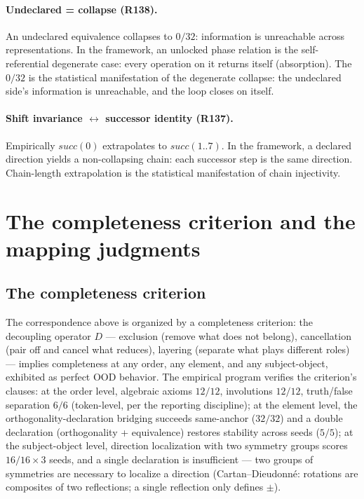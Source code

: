 \documentclass[sigplan,10pt,anonymous,review]{acmart}
\begin{document}
\paragraph{Undeclared = collapse (R138).}
An undeclared equivalence collapses to $0/32$: information is
unreachable across representations. In the framework, an unlocked phase
relation is the self-referential degenerate case: every operation on it
returns itself (absorption). The $0/32$ is the statistical
manifestation of the degenerate collapse: the undeclared side's
information is unreachable, and the loop closes on itself.

\paragraph{Shift invariance $\leftrightarrow$ successor identity (R137).}
Empirically $\mathit{succ}(0)$ extrapolates to $\mathit{succ}(1..7)$.
In the framework, a declared direction yields a non-collapsing chain:
each successor step is the same direction. Chain-length extrapolation
is the statistical manifestation of chain injectivity.

\section{The completeness criterion and the mapping judgments}

\subsection{The completeness criterion}

The correspondence above is organized by a completeness criterion: the
decoupling operator $D$ --- exclusion (remove what does not belong),
cancellation (pair off and cancel what reduces), layering (separate
what plays different roles) --- implies completeness at any order, any
element, and any subject-object, exhibited as perfect OOD behavior.
The empirical program verifies the criterion's clauses: at the order
level, algebraic axioms $12/12$, involutions $12/12$, truth/false
separation $6/6$ (token-level, per the reporting discipline); at the
element level, the orthogonality-declaration bridging succeeds
same-anchor ($32/32$) and a double declaration (orthogonality +
equivalence) restores stability across seeds ($5/5$); at the
subject-object level, direction localization with two symmetry groups
scores $16/16 \times 3$ seeds, and a single declaration is
insufficient --- two groups of symmetries are necessary to localize a
direction (Cartan--Dieudonn\'e: rotations are composites of two
reflections; a single reflection only defines $\pm$).
\end{document}
